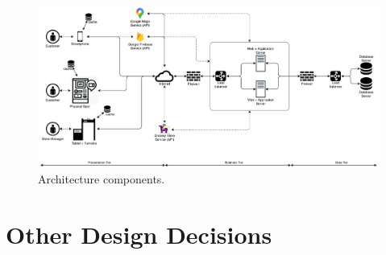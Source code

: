 \begin{figure}[H] %
	\centering
	\includegraphics[width=1.0\textwidth]{images/architecture_components.pdf}
	\caption{Architecture components.}
\end{figure} %

\section{Other Design Decisions}
